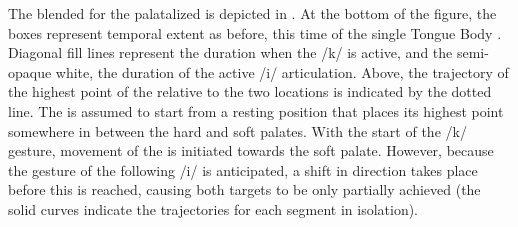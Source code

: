 The blended  for the palatalized  is depicted in . 
At the bottom of the figure, the boxes represent
temporal extent as before, this time of the single Tongue Body .
Diagonal fill lines represent the duration when the {/k/}
 is active, and the semi-opaque white, the duration of the active
{/i/} articulation. Above, the trajectory of the highest
point of the  relative to the two  locations is indicated
by the dotted line. The  is assumed to start from a resting
position that places its highest point somewhere in between the hard
and soft palates. With the start of the {/k/} gesture, movement
of the  is initiated towards the soft palate. However,
because the gesture of the following {/i/} is anticipated,
a shift in direction takes place before this  is reached, causing
both targets to be only partially achieved (the solid curves indicate
the  trajectories for each segment in isolation). 

